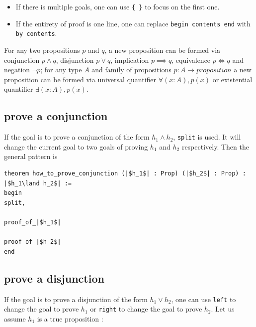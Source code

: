 \documentclass{report}
\theoremstyle{definition}
\begin{document}
\begin{itemize}
\begin{itemize}
    {\tt \small linarith [h1, ..., hn]} is equivalent to use {\tt \small linarith} with additional (proofs of) propositions {\tt \small h1} \dots {\tt \small { hn}}.
    \item {\tt \small tidy} is to ask {\tt \small Lean} to try different tactics and finishes the goal if it possible.
    \item {\tt \small tauto} is used to prove a goal of tautology.
  \end{itemize}

  \item If there is multiple goals, one can use {\tt \small \{ \}} to focus on the first one.
  \item If the entirety of proof is one line, one can replace {\tt \small begin contents end} with {\tt \small by contents}.
\end{itemize}


For any two propositions $p$ and $q$, a new proposition can be formed via conjunction $p\land q$, disjunction $p\lor q$, implication $p\implies q$, equivalence $p\iff q$ and negation $\neg p$; for any type $A$ and family of propositions $p : A \to proposition$ a new proposition can be formed via universal quantifier $\forall (x:A), p(x)$ or existential quantifier $\exists (x:A), p(x)$.

\subsection{prove a conjunction}\label{lean:conj}
If the goal is to prove a conjunction of the form $h_1 \land h_2$, {\tt \small split} is used. It will change the current goal to two goals of proving $h_1$ and $h_2$ respectively. Then the general pattern is

\begin{verbatim}
theorem how_to_prove_conjunction (|$h_1$| : Prop) (|$h_2$| : Prop) : |$h_1\land h_2$| :=
begin
split,

proof_of_|$h_1$|

proof_of_|$h_2$|
end
\end{verbatim}


\subsection{prove a disjunction}\label{lean:disjun}
If the goal is to prove a disjunction of the form $h_1 \lor h_2$, one can use {\tt \small left} to change the goal to prove $h_1$ or {\tt \small right} to change the goal to prove $h_2$. Let us assume $h_1$ is a true proposition :
\end{document}
